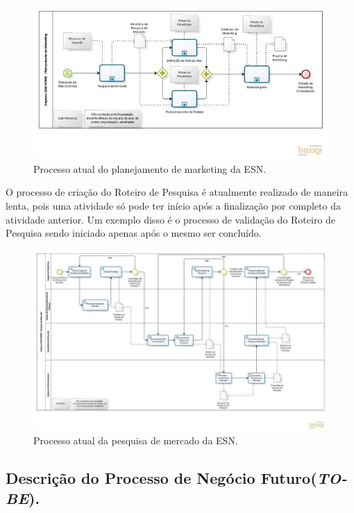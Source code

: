 		\begin{figure}[!htp]
			\centering
			\includegraphics{imagens/as-is.jpg}
			\caption{Processo atual do planejamento de marketing da ESN.}
			\label{imagem}
		\end{figure}

		\newpage
		\vspace*{1cm}
		O processo de criação do Roteiro de Pesquisa é atualmente realizado de maneira lenta, pois uma atividade só pode ter início após a finalização por completo da atividade anterior. Um exemplo disso é o processo de validação do Roteiro de Pesquisa sendo iniciado apenas após o mesmo ser concluído.
		\begin{figure}[!htp]
			\centering
			\includegraphics{imagens/as-is2.jpg}
			\caption{Processo atual da pesquisa de mercado da ESN.}
			\label{imagem}
		\end{figure}

		\newpage
	\subsection{Descrição do Processo de Negócio Futuro(\textit{TO-BE}).}

